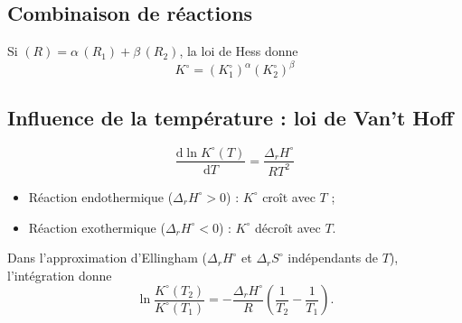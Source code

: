 \documentclass[11pt,a4paper]{article}
\newcommand{\dd}{\mathrm{d}}
\newcommand{\rH}{\Delta_r H}
\newcommand{\rS}{\Delta_r S}
\newcommand{\std}{^\circ}
\begin{document}
\subsection{Combinaison de réactions}

\begin{resultat}
Si $(R) = \alpha\,(R_1) + \beta\,(R_2)$, la loi de Hess donne
\[
  K\std = \left(K_1\std\right)^{\alpha}\left(K_2\std\right)^{\beta}
\]
\end{resultat}

\subsection{Influence de la température : loi de Van't Hoff}

\begin{resultat}[title={Loi de Van't Hoff}]
\[
  \frac{\dd \ln K\std(T)}{\dd T} = \frac{\rH\std}{RT^2}
\]
\begin{itemize}[nosep]
  \item Réaction endothermique ($\rH\std > 0$) : $K\std$ croît avec $T$ ;
  \item Réaction exothermique ($\rH\std < 0$) : $K\std$ décroît avec $T$.
\end{itemize}
\end{resultat}

Dans l'approximation d'Ellingham ($\rH\std$ et $\rS\std$ indépendants de $T$),
l'intégration donne
\[
  \ln\frac{K\std(T_2)}{K\std(T_1)} = -\frac{\rH\std}{R}\left(\frac{1}{T_2}-\frac{1}{T_1}\right).
\]
\end{document}
